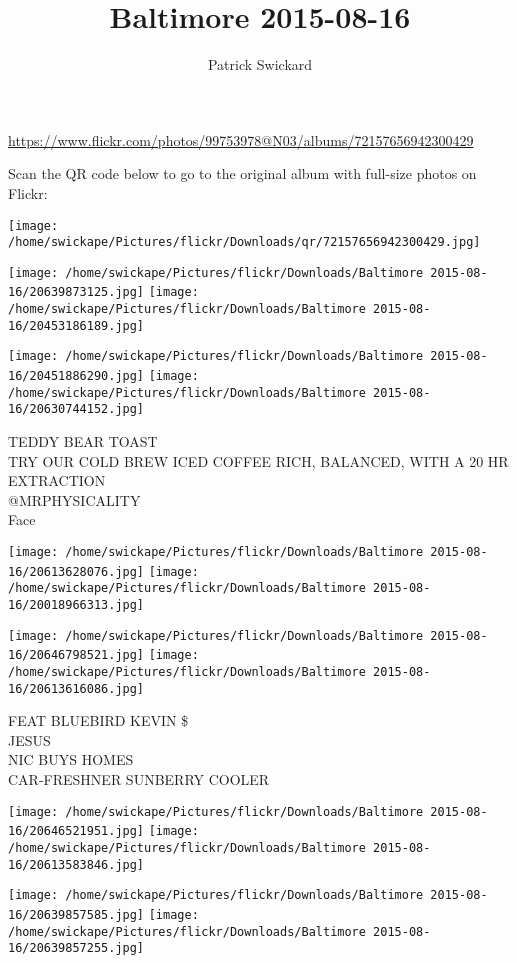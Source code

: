 \documentclass[10pt,letterpaper]{article}
\title{Baltimore 2015-08-16}
\author{Patrick Swickard}
\date{}
\begin{document}
\maketitle

\url{https://www.flickr.com/photos/99753978@N03/albums/72157656942300429}

Scan the QR code below to go to the original album with full-size photos on Flickr:

\texttt{[image: /home/swickape/Pictures/flickr/Downloads/qr/72157656942300429.jpg]}
\pagebreak

\texttt{[image: /home/swickape/Pictures/flickr/Downloads/Baltimore 2015-08-16/20639873125.jpg]}
\texttt{[image: /home/swickape/Pictures/flickr/Downloads/Baltimore 2015-08-16/20453186189.jpg]}

\texttt{[image: /home/swickape/Pictures/flickr/Downloads/Baltimore 2015-08-16/20451886290.jpg]}
\texttt{[image: /home/swickape/Pictures/flickr/Downloads/Baltimore 2015-08-16/20630744152.jpg]}

TEDDY BEAR TOAST\\
TRY OUR COLD BREW ICED COFFEE RICH, BALANCED, WITH A 20 HR EXTRACTION\\
@MRPHYSICALITY\\
Face
\pagebreak

\texttt{[image: /home/swickape/Pictures/flickr/Downloads/Baltimore 2015-08-16/20613628076.jpg]}
\texttt{[image: /home/swickape/Pictures/flickr/Downloads/Baltimore 2015-08-16/20018966313.jpg]}

\texttt{[image: /home/swickape/Pictures/flickr/Downloads/Baltimore 2015-08-16/20646798521.jpg]}
\texttt{[image: /home/swickape/Pictures/flickr/Downloads/Baltimore 2015-08-16/20613616086.jpg]}

FEAT BLUEBIRD KEVIN \$\\
JESUS\\
NIC BUYS HOMES\\
CAR{-}FRESHNER SUNBERRY COOLER
\pagebreak

\texttt{[image: /home/swickape/Pictures/flickr/Downloads/Baltimore 2015-08-16/20646521951.jpg]}
\texttt{[image: /home/swickape/Pictures/flickr/Downloads/Baltimore 2015-08-16/20613583846.jpg]}

\texttt{[image: /home/swickape/Pictures/flickr/Downloads/Baltimore 2015-08-16/20639857585.jpg]}
\texttt{[image: /home/swickape/Pictures/flickr/Downloads/Baltimore 2015-08-16/20639857255.jpg]}
\end{document}
